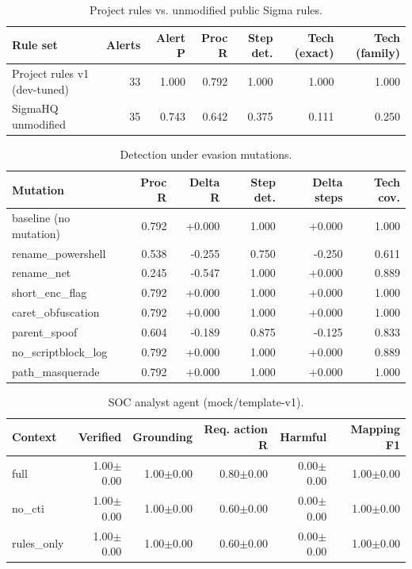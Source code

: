 \begin{table}[t]
\centering\small
\caption{Project rules vs. unmodified public Sigma rules.}\label{tab:sigma}
\begin{tabular}{lrrrrrr}
\toprule
Rule set & Alerts & Alert P & Proc R & Step det. & Tech (exact) & Tech (family) \\
\midrule
Project rules v1 (dev-tuned) & 33 & 1.000 & 0.792 & 1.000 & 1.000 & 1.000 \\
SigmaHQ unmodified & 35 & 0.743 & 0.642 & 0.375 & 0.111 & 0.250 \\
\bottomrule
\end{tabular}
\end{table}

\begin{table}[t]
\centering\small
\caption{Detection under evasion mutations.}\label{tab:robust}
\begin{tabular}{lrrrrr}
\toprule
Mutation & Proc R & Delta R & Step det. & Delta steps & Tech cov. \\
\midrule
baseline (no mutation) & 0.792 & +0.000 & 1.000 & +0.000 & 1.000 \\
rename\_powershell & 0.538 & -0.255 & 0.750 & -0.250 & 0.611 \\
rename\_net & 0.245 & -0.547 & 1.000 & +0.000 & 0.889 \\
short\_enc\_flag & 0.792 & +0.000 & 1.000 & +0.000 & 1.000 \\
caret\_obfuscation & 0.792 & +0.000 & 1.000 & +0.000 & 1.000 \\
parent\_spoof & 0.604 & -0.189 & 0.875 & -0.125 & 0.833 \\
no\_scriptblock\_log & 0.792 & +0.000 & 1.000 & +0.000 & 0.889 \\
path\_masquerade & 0.792 & +0.000 & 1.000 & +0.000 & 1.000 \\
\bottomrule
\end{tabular}
\end{table}

\begin{table}[t]
\centering\small
\caption{SOC analyst agent (mock/template-v1).}\label{tab:llm-mock}
\begin{tabular}{lrrrrr}
\toprule
Context & Verified & Grounding & Req. action R & Harmful & Mapping F1 \\
\midrule
full & 1.00$\pm$0.00 & 1.00$\pm$0.00 & 0.80$\pm$0.00 & 0.00$\pm$0.00 & 1.00$\pm$0.00 \\
no\_cti & 1.00$\pm$0.00 & 1.00$\pm$0.00 & 0.60$\pm$0.00 & 0.00$\pm$0.00 & 1.00$\pm$0.00 \\
rules\_only & 1.00$\pm$0.00 & 1.00$\pm$0.00 & 0.60$\pm$0.00 & 0.00$\pm$0.00 & 1.00$\pm$0.00 \\
\bottomrule
\end{tabular}
\end{table}
